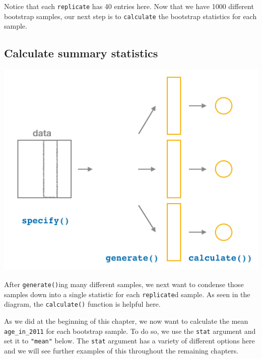 \documentclass[12pt, krantz2,]{krantz}
\makeatletter
\newenvironment{Shaded}{\begin{snugshade}}{\end{snugshade}}
\newcommand{\DataTypeTok}[1]{\textcolor[rgb]{0.27,0.27,0.27}{#1}}
\newcommand{\DecValTok}[1]{\textcolor[rgb]{0.06,0.06,0.06}{#1}}
\newcommand{\KeywordTok}[1]{\textcolor[rgb]{0.27,0.27,0.27}{\textbf{#1}}}
\newcommand{\NormalTok}[1]{#1}
\newcommand{\OperatorTok}[1]{\textcolor[rgb]{0.43,0.43,0.43}{\textbf{#1}}}
\newcommand{\StringTok}[1]{\textcolor[rgb]{0.5,0.5,0.5}{#1}}
\newenvironment{kframe}{%
\medskip{}
\setlength{\fboxsep}{.8em}
 \def\at@end@of@kframe{}%
 \ifinner\ifhmode%
  \def\at@end@of@kframe{\end{minipage}}%
  \begin{minipage}{\columnwidth}%
 \fi\fi%
 \def\FrameCommand##1{\hskip\@totalleftmargin \hskip-\fboxsep
 \colorbox{shadecolor}{##1}\hskip-\fboxsep
     \hskip-\linewidth \hskip-\@totalleftmargin \hskip\columnwidth}%
 \MakeFramed {\advance\hsize-\width
   \@totalleftmargin\z@ \linewidth\hsize
   \@setminipage}}%
 {\par\unskip\endMakeFramed%
 \at@end@of@kframe}
\renewenvironment{Shaded}{\begin{kframe}}{\end{kframe}}
\makeatother
\begin{document}
Notice that each \texttt{replicate} has 40 entries here. Now that we have 1000 different bootstrap samples, our next step is to \texttt{calculate} the bootstrap statistics for each sample.

\hypertarget{calculate-summary-statistics}{%
\subsection{Calculate summary statistics}\label{calculate-summary-statistics}}

\begin{center}\includegraphics[width=\textwidth]{images/flowcharts/infer/calculate} \end{center}

After \texttt{generate()}ing many different samples, we next want to condense those samples down into a single statistic for each \texttt{replicate}d sample. As seen in the diagram, the \texttt{calculate()} function is helpful here.

As we did at the beginning of this chapter, we now want to calculate the mean \texttt{age\_in\_2011} for each bootstrap sample. To do so, we use the \texttt{stat} argument and set it to \texttt{"mean"} below. The \texttt{stat} argument has a variety of different options here and we will see further examples of this throughout the remaining chapters.

\begin{Shaded}
\end{Shaded}
\end{document}
